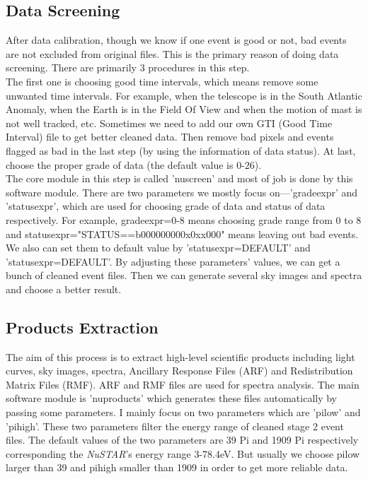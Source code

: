 \documentclass[12pt]{report}
\begin{document}
            
            \subsection{Data Screening}  
              After data calibration, though we know if one event is good or not, bad events are not excluded from 
              original
              files. This is the primary reason of doing data screening. There are primarily 3 procedures in this 
              step.\\
              \indent The first one is choosing good time intervals, which means remove some unwanted time 
              intervals. For 
              example, when the telescope is in the South Atlantic Anomaly, when the Earth is in the Field Of 
              View and 
              when the motion of mast is not well tracked, etc. Sometimes we need to add our own GTI (Good Time 
              Interval) file to get better cleaned data. 
              Then remove bad pixels and events flagged as 
              bad in the 
              last step (by using the information of data status). At last, choose the proper grade of data 
              (the default value is 0-26). \\
              \indent The core module in this step is called 'nuscreen' and most of job is done by this software 
              module.  
              There are two parameters we mostly focus on---'gradeexpr' and 'statusexpr', which are used for choosing 
              grade of data and status of data respectively. For example, gradeexpr=0-8 means choosing grade range 
              from 0 to 8 and statusexpr="STATUS==b000000000x0xx000" means leaving out bad events. We also can set  
              them to default value by 'statusexpr=DEFAULT' and 'statusexpr=DEFAULT'. By adjusting these parameters' 
              values, we can get a bunch of cleaned event files. Then we can generate several sky images and 
              spectra and 
              choose a better result. 

             \subsection{Products Extraction}
              The aim of this process is to extract high-level scientific products including light curves, sky images,
              spectra, Ancillary Response Files (ARF) and Redistribution Matrix Files (RMF). ARF and RMF files are 
              used for spectra analysis. The main software module is 'nuproducts' which generates these files 
              automatically by 
              passing some parameters. I mainly focus on two parameters which are 'pilow' and 'pihigh'. These two 
              parameters filter the energy range of cleaned stage 2 event files. The default values of the two 
              parameters
              are 39 Pi and 1909 Pi respectively corresponding the \textit{NuSTAR}'s energy range 3-78.4eV. But 
              usually we 
              choose pilow larger than 39 and pihigh smaller than 1909 in order to get more reliable data.
\end{document}
